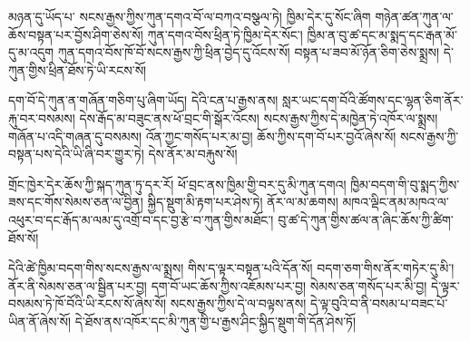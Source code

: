 \documentclass[12pt]{nextbook}
\begin{document}
\begin{readersection}{མཉན་དུ་ཡོད་པ་}
སངས་རྒྱས་ཀྱིས་ཀུན་དགའ་བོ་ལ་བཀའ་བསྩལ་ཏེ། ཁྱིམ་དེར་དུ་སོང་ཞིག གཉེན་ཚན་ཀུན་ལ་ཆོས་བསྟན་པར་བྱོས་ཤིག་ཅེས་སོ། ཀུན་དགའ་བོས་ཕྲིན་ཏེ་ཁྱིམ་དེར་སོང་། ཁྱིམ་ན་བུ་ཚ་དང་མ་སྨད་དང་རྒན་མོ་དུ་མ་འདུག ཀུན་དགའ་བོས་ཁོ་བོ་སངས་རྒྱས་ཀྱི་ཕྲིན་བྱེད་དུ་འོངས་སོ། བསྟན་པ་ཟབ་མོ་ཉོན་ཅིག་ཅེས་སྨྲས། དེ་ཀུན་གྱིས་ཕྲིན་ཐོས་ཏེ་ཡི་རངས་སོ།

དག་བོ་དེ་ཀུན་ན་གཞོན་གཅིག་པུ་ཞིག་ཡོད། དེའི་ངན་པ་རྒྱས་ནས། སླར་ཡང་དག་བོའི་ཚོགས་དང་ལྷན་ཅིག་ནོར་རྐུ་བར་བསམས། དེས་རྒོད་མ་བཟུང་ནས་ཕོ་བྲང་གི་སྒོར་འོངས། སངས་རྒྱས་ཀྱིས་དེ་མཁྱེན་ཏེ་འཁོར་ལ་སྨྲས། གཞོན་པ་འདི་གཞན་དུ་བསམས། འོན་ཀྱང་གསོད་པར་མ་བྱ། ཆོས་ཀྱིས་དག་བོ་པར་བྱའོ་ཞེས་སོ། སངས་རྒྱས་ཀྱི་བསྟན་པས་དེའི་ཡི་ཞི་བར་གྱུར་ཏེ། དེས་ནོར་མ་བརྐུས་སོ།

གྲོང་ཁྱེར་དེར་ཆོས་ཀྱི་སྐད་ཀུན་ཏུ་དར་རོ། ཕོ་བྲང་ནས་ཁྱིམ་གྱི་བར་དུ་མི་ཀུན་དགའ། ཁྱིམ་བདག་གི་བུ་སྨད་ཀྱིས་ཟས་དང་གོས་སེམས་ཅན་ལ་བྱིན། སྐྱིད་སྡུག་མི་རྟག་པར་ཤེས་ཏེ། ནོར་ལ་མ་ཆགས། མཁའ་ལྡིང་ནམ་མཁའ་ལ་འཕུར་བ་དང་རྒོད་མ་ལམ་དུ་འགྲོ་བ་དང་བྱ་རྩེ་བ་ཀུན་གྱིས་མཐོང་། བུ་ཚ་དེ་ཀུན་གྱིས་ཚལ་ན་ཞིང་ཆོས་ཀྱི་ཚིག་ཐོས་སོ།

དེའི་ཚེ་ཁྱིམ་བདག་གིས་སངས་རྒྱས་ལ་སྨྲས། གིས་ད་ལྟར་བསྟན་པའི་དོན་སོ། བདག་ཅག་གིས་ནོར་གཏེར་དུ་མི་། ནོར་ནི་སེམས་ཅན་ལ་སྦྱིན་པར་བྱ། དག་བོ་ཡང་ཆོས་ཀྱིས་འཇོམས་པར་བྱ། སེམས་ཅན་གསོད་པར་མི་བྱ། དེ་ལྟར་བསམས་ཏེ་ཁོ་བོའི་ཡི་རངས་སོ་ཞེས་སོ། སངས་རྒྱས་ཀྱིས་དེ་ལ་བལྟས་ནས། དེ་ལྟ་བུའི་བ་ནི་བསམ་པ་བཟང་པོ་ཡིན་ནོ་ཞེས་སོ། དེ་ཐོས་ནས་འཁོར་དང་མི་ཀུན་གྱི་པ་རྒྱས་ཤིང་སྐྱིད་སྡུག་གི་དོན་ཤེས་ཏོ།
\end{readersection}
\end{document}
